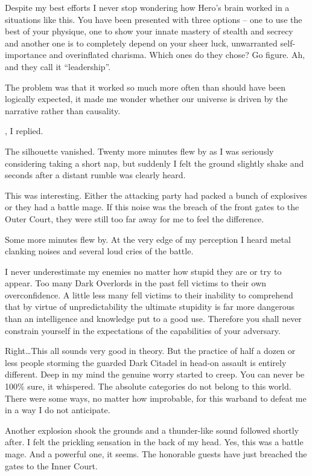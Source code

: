 Despite my best efforts I never stop wondering how Hero’s brain worked in a situations like this. You have been presented with three options – one to use the best of your physique, one to show your innate mastery of stealth and secrecy and another one is to completely depend on your sheer luck, unwarranted self-importance and overinflated charisma. Which ones do they chose? Go figure. Ah, and they call it “leadership”.

The problem was that it worked so much more often than should have been logically expected, it made me wonder whether our universe is driven by the narrative rather than causality.

, I replied. 

The silhouette vanished. Twenty more minutes flew by as I was seriously considering taking a short nap, but suddenly I felt the ground slightly shake and seconds after a distant rumble was clearly heard.

This was interesting. Either the attacking party had packed a bunch of explosives or they had a battle mage. If this noise was the breach of the front gates to the Outer Court, they were still too far away for me to feel the difference.

Some more minutes flew by. At the very edge of my perception I heard metal clanking noises and several loud cries of the battle.

I never underestimate my enemies no matter how stupid they are or try to appear. Too many Dark Overlords in the past fell victims to their own overconfidence. A little less many fell victims to their inability to comprehend that by virtue of unpredictability the ultimate stupidity is far more dangerous than an intelligence and knowledge put to a good use. Therefore you shall never constrain yourself in the expectations of the capabilities of your adversary.

Right\dots This all sounds very good in theory. But the practice of half a dozen or less people storming the guarded Dark Citadel in head-on assault is entirely different. Deep in my mind the genuine worry started to creep. You can never be 100\% sure, it whispered. The absolute categories do not belong to this world. There were some ways, no matter how improbable, for this warband to defeat me in a way I do not anticipate.

Another explosion shook the grounds and a thunder-like sound followed shortly after. I felt the prickling sensation in the back of my head. Yes, this was a battle mage. And a powerful one, it seems. The honorable guests have just breached the gates to the Inner Court.

